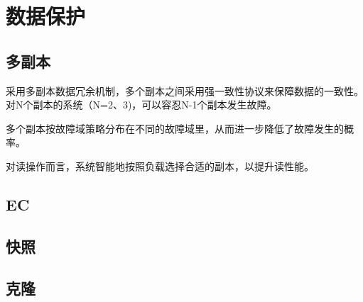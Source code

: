 \chapter{数据保护}

\section{多副本}

采用多副本数据冗余机制，多个副本之间采用强一致性协议来保障数据的一致性。
对N个副本的系统（N=2、3)，可以容忍N-1个副本发生故障。

多个副本按故障域策略分布在不同的故障域里，从而进一步降低了故障发生的概率。

对读操作而言，系统智能地按照负载选择合适的副本，以提升读性能。

\section{EC}

\section{快照}

\section{克隆}
